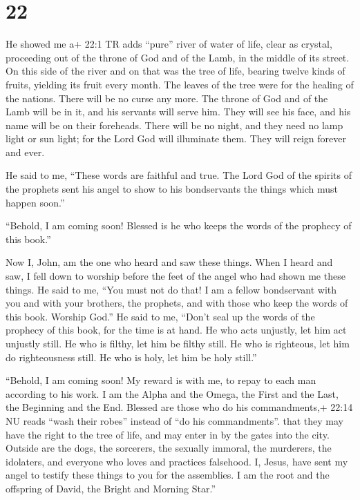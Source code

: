 \hypertarget{section-21}{%
\section{22}\label{section-21}}

 He showed me a+ 22:1 TR adds ``pure'' river of water of
life, clear as crystal, proceeding out of the throne of God and of the
Lamb,  in the middle of its street. On this side of the
river and on that was the tree of life, bearing twelve kinds of fruits,
yielding its fruit every month. The leaves of the tree were for the
healing of the nations.  There will be no curse any more.
The throne of God and of the Lamb will be in it, and his servants will
serve him.  They will see his face, and his name will be on
their foreheads.  There will be no night, and they need no
lamp light or sun light; for the Lord God will illuminate them. They
will reign forever and ever.

 He said to me, ``These words are faithful and true. The
Lord God of the spirits of the prophets sent his angel to show to his
bondservants the things which must happen soon.''

 ``Behold, I am coming soon! Blessed is he who keeps the
words of the prophecy of this book.''

 Now I, John, am the one who heard and saw these things.
When I heard and saw, I fell down to worship before the feet of the
angel who had shown me these things.  He said to me, ``You
must not do that! I am a fellow bondservant with you and with your
brothers, the prophets, and with those who keep the words of this book.
Worship God.''  He said to me, ``Don't seal up the words of
the prophecy of this book, for the time is at hand.  He who
acts unjustly, let him act unjustly still. He who is filthy, let him be
filthy still. He who is righteous, let him do righteousness still. He
who is holy, let him be holy still.''

 ``Behold, I am coming soon! My reward is with me, to repay
to each man according to his work.  I am the Alpha and the
Omega, the First and the Last, the Beginning and the End. 
Blessed are those who do his commandments,+ 22:14 NU reads ``wash their
robes'' instead of ``do his commandments''. that they may have the right
to the tree of life, and may enter in by the gates into the city.
 Outside are the dogs, the sorcerers, the sexually immoral,
the murderers, the idolaters, and everyone who loves and practices
falsehood.  I, Jesus, have sent my angel to testify these
things to you for the assemblies. I am the root and the offspring of
David, the Bright and Morning Star.''

